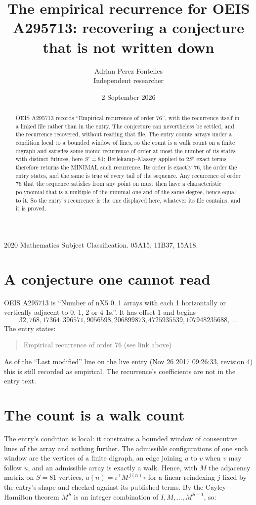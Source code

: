 \documentclass[11pt,a4paper]{article}
\title{The empirical recurrence for OEIS A295713: recovering a conjecture that is not written down}
\author{Adrian Perez Fontelles\\ \small Independent researcher}
\date{2 September 2026}
\theoremstyle{plain}
\theoremstyle{definition}
\begin{document}
\maketitle

\begin{abstract}
OEIS A295713 records ``Empirical recurrence of order $76$'', with the recurrence itself in a
linked file rather than in the entry. The conjecture can nevertheless be settled, and the
recurrence recovered, without reading that file. The entry counts arrays under a condition
local to a bounded window of lines, so the count is a walk count on a finite digraph and
satisfies some monic recurrence of order at most the number of its states with distinct
futures, here $S'=81$; Berlekamp--Massey applied to $2S'$ exact
terms therefore returns the MINIMAL such recurrence. Its order is exactly $76$, the order
the entry states, and the same is true of every tail of the sequence. Any recurrence of order
$76$ that the sequence satisfies from any point on must then have a characteristic
polynomial that is a multiple of the minimal one and of the same degree, hence equal to it. So
the entry's recurrence is the one displayed here, whatever its file contains, and it is
proved.
\end{abstract}

\noindent\small 2020 Mathematics Subject Classification. 05A15, 11B37, 15A18.\normalsize

\section{A conjecture one cannot read}

OEIS A295713 is ``Number of nX5 0..1 arrays with each 1 horizontally or vertically adjacent to 0, 1, 2 or 4 1s.''. It has offset $1$ and begins
\[
32, 768, 17364, 396571, 9056598, 206899873, 4725935539, 107948235688,\ \dots
\]
The entry states:
\begin{quote}
Empirical recurrence of order 76 (see link above)
\end{quote}
As of the ``Last modified'' line on the live entry (Nov 26 2017 09:26:33, revision 4) this is still
recorded as empirical. The recurrence's coefficients are not in the entry text.

\section{The count is a walk count}

The entry's condition is local: it constrains a bounded window of consecutive lines of the
array and nothing further. The admissible configurations of one such window are the vertices
of a finite digraph, an edge joining $u$ to $v$ when $v$ may follow $u$, and an admissible
array is exactly a walk. Hence, with $M$ the adjacency matrix on $S=81$ vertices,
$a(n)=\iota^{\!\top}M^{\,j(n)}\tau$ for a linear reindexing $j$ fixed by the entry's shape
and checked against its published terms. By the Cayley--Hamilton theorem $M^{S}$ is an
integer combination of $I,M,\dots,M^{S-1}$, so:
\end{document}
